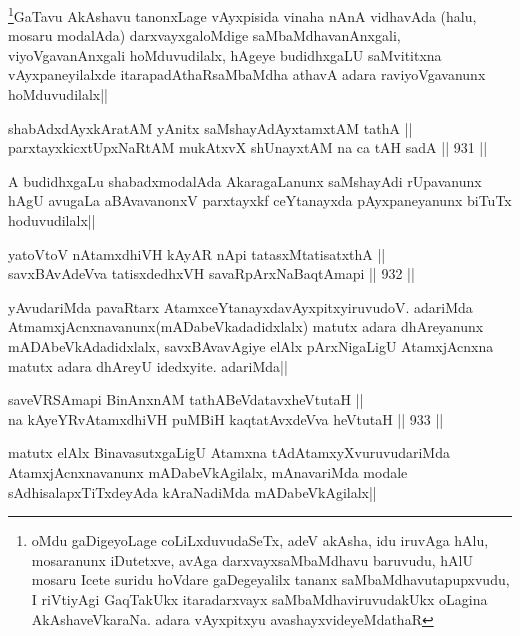 \begin{artha}
\footnote{oMdu gaDigeyoLage coLiLxduvudaSeTx, adeV akAsha, idu iruvAga hAlu, mosaranunx iDutetxve, avAga darxvayxsaMbaMdhavu baruvudu, hAlU mosaru Icete suridu hoVdare gaDegeyalilx tananx saMbaMdhavutapupxvudu, I riVtiyAgi GaqTakUkx itaradarxvayx saMbaMdhaviruvudakUkx oLagina AkAshaveVkaraNa. adara vAyxpitxyu avashayxvideyeMdathaR}GaTavu AkAshavu tanonxLage vAyxpisida vinaha nAnA vidhavAda (halu, mosaru modalAda) darxvayxgaloMdige saMbaMdhavanAnxgali, viyoVgavanAnxgali hoMduvudilalx, hAgeye budidhxgaLU saMvititxna vAyxpaneyilalxde itarapadAthaRsaMbaMdha athavA adara raviyoVgavanunx hoMduvudilalx||
\end{artha}


\begin{shl}
shabAdxdAyxkAratAM yAnitx saMshayAdAyxtamxtAM tathA ||  \\
parxtayxkicxtUpxNaRtAM mukAtxvX shUnayxtAM na ca tAH sadA ||  931 ||  
\end{shl}

\begin{artha}
A budidhxgaLu shabadxmodalAda AkaragaLanunx saMshayAdi rUpavanunx hAgU avugaLa aBAvavanonxV parxtayxkf ceYtanayxda pAyxpaneyanunx biTuTx hoduvudilalx||
\end{artha}


\begin{shl}
yatoV\s toV nA\s \s tamxdhiVH kAyAR nApi tatasxMtatisatxthA || \\
savxBAvAdeVva tatisxdedhxVH savaRpArxNaBaqtAmapi ||  932 ||  
\end{shl}

\begin{artha}
yAvudariMda pavaRtarx AtamxceYtanayxdavAyxpitxyiruvudoV. adariMda AtmamxjAcnxnavanunx(mADabeVkadadidxlalx) matutx adara dhAreyanunx mADAbeVkAdadidxlalx, savxBAvavAgiye elAlx pArxNigaLigU AtamxjAcnxna matutx adara dhAreyU idedxyite. adariMda||
\end{artha}

\begin{shl}
saveVRSAmapi BinAnxnAM tathA\s BeVdatavxheVtutaH || \\
na kAyeYRvA\s \s tamxdhiVH puMBiH kaqtatAvxdeVva heVtutaH ||  933 ||  
\end{shl}

\begin{artha}
matutx elAlx BinavasutxgaLigU Atamxna tAdAtamxyXvuruvudariMda AtamxjAcnxnavanunx mADabeVkAgilalx, mAnavariMda modale sAdhisalapxTiTxdeyAda kAraNadiMda mADabeVkAgilalx||
\end{artha}


